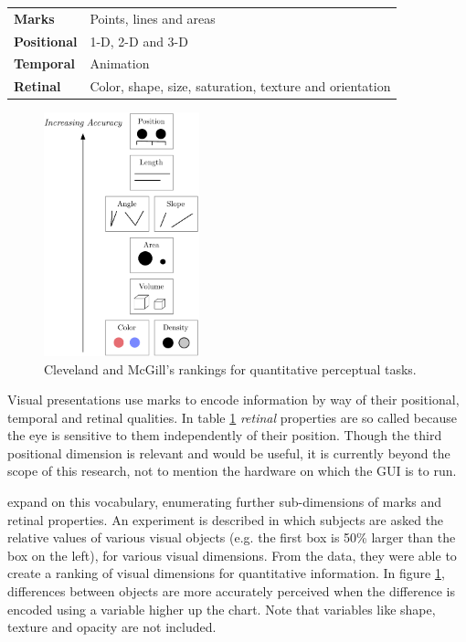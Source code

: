 \begin{table}
	\centering
	\label{tab:graphical_relationships}
		\begin{tabular}{l  l}
		\hline\hline
		\textbf{Marks}& Points, lines and areas\\
		\textbf{Positional}& 1-D, 2-D and 3-D\\
		\textbf{Temporal}& Animation\\
		\textbf{Retinal}& Color, shape, size, saturation, texture and orientation\\
		\hline
		\end{tabular}
\end{table}

\begin{figure}
	\centering
		\includegraphics[width=0.4\textwidth]{figures/accuracy_of_visual_dimensions}
		\caption{Cleveland and McGill's rankings for quantitative perceptual tasks.}
		\label{fig:accuracy_of_visual_dimensions}
\end{figure}

Visual presentations use marks to encode information by way of their positional, temporal and retinal qualities. In table \ref{tab:graphical_relationships} \emph{retinal} properties are so called because the eye is sensitive to them independently of their position. Though the third positional dimension is relevant and would be useful, it is currently beyond the scope of this research, not to mention the hardware on which the GUI is to run. 


 expand on this vocabulary, enumerating further sub-dimensions of marks and retinal properties. An experiment is described in which subjects are asked the relative values of various visual objects (e.g. the first box is 50\% larger than the box on the left), for various visual dimensions. From the data, they were able to create a ranking of visual dimensions for quantitative information. In figure \ref{fig:accuracy_of_visual_dimensions}, differences between objects are more accurately perceived when the difference is encoded using a variable higher up the chart. Note that variables like shape, texture and opacity are not included. 

